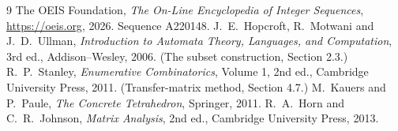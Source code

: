 \documentclass[11pt,a4paper]{article}
\theoremstyle{plain}
\theoremstyle{definition}
\begin{document}
\begin{thebibliography}{9}
 The OEIS Foundation, \emph{The On-Line Encyclopedia of Integer
Sequences}, \url{https://oeis.org}, 2026. Sequence A220148.
 J.~E.~Hopcroft, R.~Motwani and J.~D.~Ullman, \emph{Introduction to Automata
Theory, Languages, and Computation}, 3rd ed., Addison--Wesley, 2006. (The subset
construction, Section 2.3.)
 R.~P.~Stanley, \emph{Enumerative Combinatorics}, Volume 1, 2nd ed.,
Cambridge University Press, 2011. (Transfer-matrix method, Section 4.7.)
 M.~Kauers and P.~Paule, \emph{The Concrete Tetrahedron}, Springer, 2011.
 R.~A.~Horn and C.~R.~Johnson, \emph{Matrix Analysis}, 2nd ed., Cambridge
University Press, 2013.
\end{thebibliography}
\end{document}
